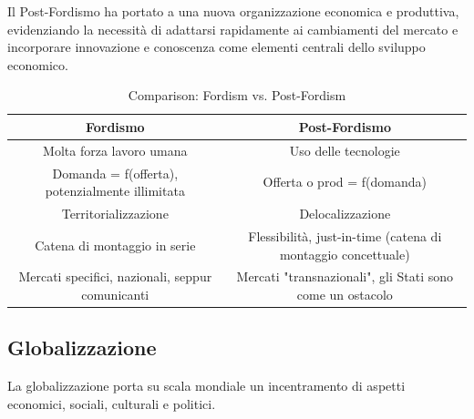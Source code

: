\documentclass[a4paper]{article}
\begin{document}
Il Post-Fordismo ha portato a una nuova organizzazione economica e produttiva, evidenziando la necessità di adattarsi rapidamente ai cambiamenti del mercato e incorporare innovazione e conoscenza come elementi centrali dello sviluppo economico.

\begin{table}[h]
    \centering
    \begin{tabular}{|c|c|}
    \hline
    \textbf{Fordismo} & \textbf{Post-Fordismo} \\ \hline
    Molta forza lavoro umana & Uso delle tecnologie \\ \hline
    Domanda = f(offerta), potenzialmente illimitata & Offerta o prod = f(domanda) \\ \hline
    Territorializzazione & Delocalizzazione \\\hline
    Catena di montaggio in serie & Flessibilità, just-in-time (catena di montaggio concettuale) \\\hline
    Mercati specifici, nazionali, seppur comunicanti & Mercati "transnazionali", gli Stati sono come un ostacolo \\ \hline
    \end{tabular}
    \caption{Comparison: Fordism vs. Post-Fordism}
\end{table}

\subsection{Globalizzazione}


La globalizzazione porta su scala mondiale un incentramento di aspetti economici, sociali, culturali e politici.
\end{document}

